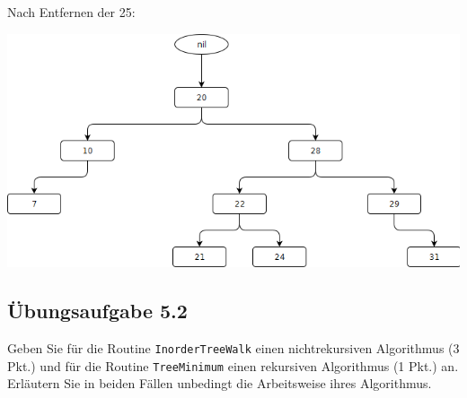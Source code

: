 \documentclass{article}
\begin{document}
Nach Entfernen der 25:\\
\begin{center}
	\includegraphics[scale=0.5]{w5-ressourcen/5-1-2-3.png}
\end{center}

\subsection*{Übungsaufgabe 5.2}
\label{ssec:5.2}
\begin{flushright}
\begin{Large}
[~~~~\string| ~~4~]
\end{Large}
\end{flushright}
Geben Sie für die Routine \texttt{InorderTreeWalk} einen nichtrekursiven Algorithmus (3 Pkt.) und für die Routine \texttt{TreeMinimum} einen rekursiven Algorithmus (1 Pkt.) an.
Erläutern Sie in beiden Fällen unbedingt die Arbeitsweise ihres Algorithmus.
\end{document}
